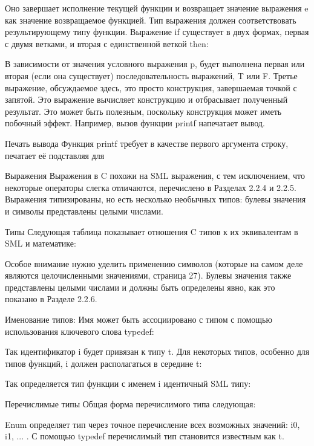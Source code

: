 Оно завершает исполнение текущей функции и возвращает значение выражения e как значение возвращаемое функцией. Тип выражения должен соответствовать результирующему типу функции. Выражение if существует в двух формах, первая с двумя ветками, и вторая с единственной веткой then:

В зависимости от значения условного выражения p, будет выполнена первая или вторая (если она существует) последовательность выражений, T или F. Третье выражение, обсуждаемое здесь, это просто конструкция, завершаемая точкой с запятой. Это выражение вычисляет конструкцию и отбрасывает полученный результат. Это может быть полезным, поскольку конструкция может иметь побочный эффект. Например, вызов функции printf напечатает вывод.

Печать вывода Функция printf требует в качестве первого аргумента строку, печатает её подставляя для %


Выражения Выражения в C похожи на SML выражения, с тем исключением, что некоторые операторы слегка отличаются, перечислено в Разделах 2.2.4 и 2.2.5. Выражения типизированы, но есть несколько необычных типов: булевы значения и символы представлены целыми числами.

Типы Следующая таблица показывает отношения C типов к их эквивалентам в SML и математике:

Особое внимание нужно уделить применению символов (которые на самом деле являются целочисленными значениями, страница 27). Булевы значения также представлены целыми числами и должны быть определены явно, как это показано в Разделе 2.2.6.

Именование типов: Имя может быть ассоциировано с типом с помощью использования ключевого слова typedef:

Так идентификатор i будет привязан к типу t. Для некоторых типов, особенно для типов функций, i должен располагаться в середине t:

Так определяется тип функции с именем i идентичный SML типу:

Перечислимые типы Общая форма перечислимого типа следующая:

Enum определяет тип через точное перечисление всех возможных значений: i0, i1, ... . С помощью typedef перечислимый тип становится известным как t.

